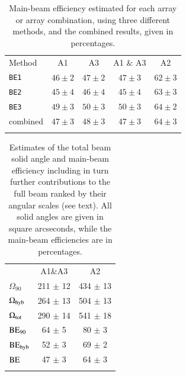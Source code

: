 \documentclass[traditionalabstract]{aa}
\begin{document}
{\begin{table}[!h]
  \caption[]{Main-beam efficiency estimated for each array or array
  combination, using three different methods, and the combined
  results, given in percentages.}
  \label{tab:beam_efficiency}
  \centering
  \begin{tabular}{l cccc}
    \hline\hline
    \noalign{\smallskip}
    Method & A1 &  A3 & A1 $\&$ A3 &  A2  \\
    \noalign{\smallskip}
    \hline
    \noalign{\smallskip}
    {\tt BE1}  &  $46 \pm 2$  & $47 \pm 2$  &  $47 \pm 3$  &  $62 \pm 3$  \\
    {\tt BE2}  &  $45 \pm 4$  & $46 \pm 4$  &  $45 \pm 4$  &  $63 \pm 3$  \\
    {\tt BE3}  &  $49 \pm 3$  & $50 \pm 3$  &  $50 \pm 3$  &  $64 \pm 2$  \\
    combined   &  $47 \pm 3$  & $48 \pm 3$  &  $47 \pm 3$  &  $64 \pm 3$  \\
    \noalign{\smallskip}
    \hline
  \end{tabular}
\end{table}
%
\begin{table}[!h]
\caption{Estimates of the total beam solid angle and main-beam
efficiency including in turn further contributions to the full beam ranked by
their angular scales (see text). All solid angles are given in square arcseconds,
while the main-beam efficiencies are in percentages.}
\label{tab:solid_corr}
\centering
\begin{tabular}{lcc}
\hline\hline
\noalign{\smallskip}
&  A1\&A3 & A2 \\
\noalign{\smallskip}
\hline
\noalign{\smallskip}
$\Omega_{90}$        &    211 $\pm$  12 & 434 $\pm$ 13 \\\noalign{\smallskip}
$\Omega_{\rm{hyb}}$   &    264 $\pm$  13 & 504 $\pm$ 13  \\\noalign{\smallskip}
$\Omega_{\rm{tot}}$   &    290 $\pm$  14 & 541 $\pm$ 18  \\\noalign{\smallskip}
\noalign{\smallskip}
\hline
\noalign{\smallskip}
$\rm{BE}_{90}$       &   64 $\pm$ 5  &  80 $\pm$ 3  \\\noalign{\smallskip}
$\rm{BE}_{\rm{hyb}}$  &   52 $\pm$ 3  &  69 $\pm$ 2  \\\noalign{\smallskip}
$\rm{BE}$            &  47  $\pm$ 3  &  64 $\pm$ 3  \\\noalign{\smallskip}
\noalign{\smallskip}
\hline
\label{tab:solid_corr}
\end{tabular}
\end{table}
%

}
\end{document}
